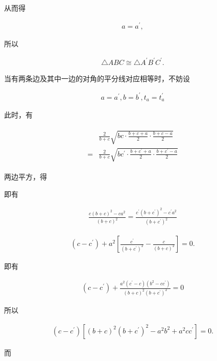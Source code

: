 \documentclass[10pt]{article}
\begin{document}
从而得

\begin{align*}
a=a^{\prime},
\end{align*}

所以

\begin{align*}
\triangle A B C \cong \triangle A^{\prime} B^{\prime} C^{\prime} .
\end{align*}

当有两条边及其中一边的对角的平分线对应相等时，不妨设

\begin{align*}
a=a^{\prime}, b=b^{\prime}, t_{a}=t_{a}^{\prime}
\end{align*}

此时，有

\begin{align*}
\begin{aligned}
& \frac{2}{b+c} \sqrt{b c \cdot \frac{b+c+a}{2} \cdot \frac{b+c-a}{2}} \\
= & \frac{2}{b+c} \sqrt{b c^{\prime} \cdot \frac{b+c^{\prime}+a}{2} \cdot \frac{b+c^{\prime}-a}{2}}
\end{aligned}
\end{align*}

两边平方，得

即有

\begin{align*}
\frac{c(b+c)^{2}-c a^{2}}{(b+c)^{2}}=\frac{c^{\prime}\left(b+c^{\prime}\right)^{2}-c^{\prime} a^{2}}{\left(b+c^{\prime}\right)^{2}}
\end{align*}

\begin{align*}
\left(c-c^{\prime}\right)+a^{2}\left[\frac{c^{\prime}}{\left(b+c^{\prime}\right)^{2}}-\frac{c}{(b+c)^{2}}\right]=0 .
\end{align*}

即有

\begin{align*}
\left(c-c^{\prime}\right)+\frac{a^{2}\left(c^{\prime}-c\right)\left(b^{2}-c c^{\prime}\right)}{(b+c)^{2}\left(b+c^{\prime}\right)^{2}}=0
\end{align*}

所以

\begin{align*}
\left(c-c^{\prime}\right)\left[(b+c)^{2}\left(b+c^{\prime}\right)^{2}-a^{2} b^{2}+a^{2} c c^{\prime}\right]=0 .
\end{align*}

而
\end{document}
